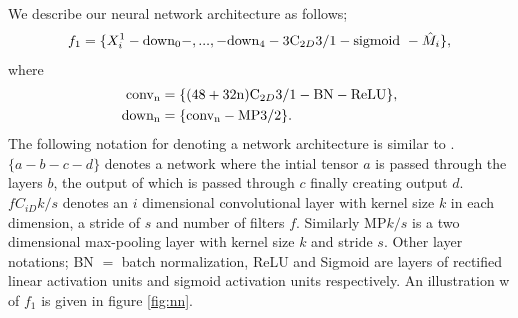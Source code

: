 \documentclass{IET}%
\begin{document}
We describe our neural network architecture as follows;
\begin{align}\label{eq:whaleconv1}
	 f_1 = \{X_i^1 - \text{down\textsubscript{0}} - , ... , - \text{down\textsubscript{4}} - 3\text{C}_{2D}3/1 - \text{sigmoid}\ - \hat{M}_i \}, 
\end{align}
	where 
\begin{align}
			 \text{conv\textsubscript{n}} &= \{(48 + 32\text{n})\text{C}_{2D}3/1 - \text{BN} - \text{ReLU}\}, \\	
     		 \text{down\textsubscript{n}}  &= \{\text{conv\textsubscript{n}}- \text{MP}3/2\}.
     		 \label{eq:whaleconv1block}
\end{align}
The following notation for denoting a network architecture is similar to \cite{graham2014fractional}. $\{a-b-c-d\}$ denotes a network where the intial tensor $a$ is passed through the layers $b$, the output of which is passed through $c$ finally creating output $d$. $fC_{iD}k/s$ denotes an $i$ dimensional convolutional layer with kernel size $k$ in each dimension, a stride of $s$ and number of filters $f$. Similarly MP$k/s$ is a two dimensional max-pooling layer with kernel size $k$ and stride $s$. Other layer notations; BN $=$ batch normalization, ReLU and Sigmoid are layers of rectified linear activation units and sigmoid activation units respectively. An illustration w of $f_1$ is given in figure \ref{fig:nn}.
\end{document}
